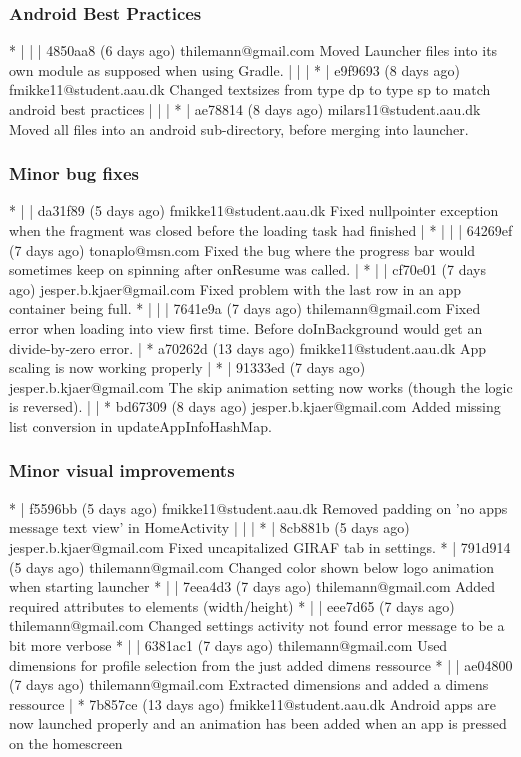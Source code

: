\subsubsection{Android Best Practices}
* | | | 4850aa8 (6 days ago) thilemann@gmail.com Moved Launcher files into its own module as supposed when using Gradle.
| | | * | e9f9693 (8 days ago) fmikke11@student.aau.dk Changed textsizes from type dp to type sp to match android best practices
| | | * | ae78814 (8 days ago) milars11@student.aau.dk Moved all files into an android sub-directory, before merging into launcher.

\subsubsection{Minor bug fixes}
* | | da31f89 (5 days ago) fmikke11@student.aau.dk Fixed nullpointer exception when the fragment was closed before the loading task had finished
| * | | | 64269ef (7 days ago) tonaplo@msn.com Fixed the bug where the progress bar would sometimes keep on spinning after onResume was called.
| * | | cf70e01 (7 days ago) jesper.b.kjaer@gmail.com Fixed problem with the last row in an app container being full.
* | | | 7641e9a (7 days ago) thilemann@gmail.com Fixed error when loading into view first time. Before doInBackground would get an divide-by-zero error.
| * a70262d (13 days ago) fmikke11@student.aau.dk App scaling is now working properly
| * | 91333ed (7 days ago) jesper.b.kjaer@gmail.com The skip animation setting now works (though the logic is reversed).
| | * bd67309 (8 days ago) jesper.b.kjaer@gmail.com Added missing list conversion in updateAppInfoHashMap.

\subsubsection{Minor visual improvements}
* | f5596bb (5 days ago) fmikke11@student.aau.dk Removed padding on 'no apps message text view' in HomeActivity
| | | * | 8cb881b (5 days ago) jesper.b.kjaer@gmail.com Fixed uncapitalized GIRAF tab in settings.
* | 791d914 (5 days ago) thilemann@gmail.com Changed color shown below logo animation when starting launcher
* | | 7eea4d3 (7 days ago) thilemann@gmail.com Added required attributes to elements (width/height)
* | | eee7d65 (7 days ago) thilemann@gmail.com Changed settings activity not found error message to be a bit more verbose
* | | 6381ac1 (7 days ago) thilemann@gmail.com Used dimensions for profile selection from the just added dimens ressource
* | | ae04800 (7 days ago) thilemann@gmail.com Extracted dimensions and added a dimens ressource
| * 7b857ce (13 days ago) fmikke11@student.aau.dk Android apps are now launched properly and an animation has been added when an app is pressed on the homescreen